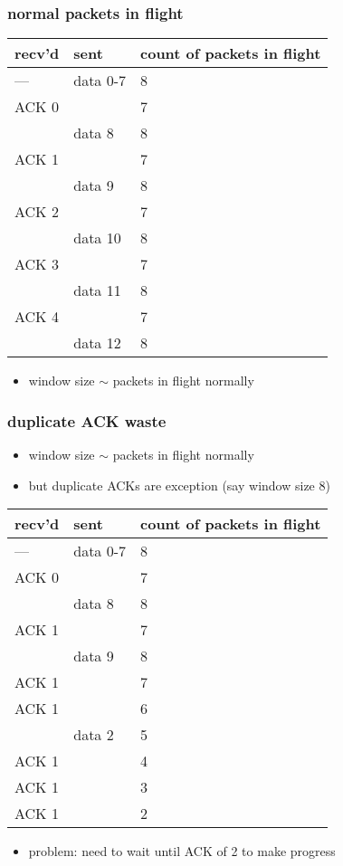 \begin{frame}
\frametitle{normal packets in flight}
{\fontsize{10}{11}\selectfont
\begin{tabular}{lll}
recv'd & sent & count of packets in flight \\ \hline
--- & data 0-7 & 8 \\
ACK 0 & ~ & 7 \\
~ & data 8 & 8 \\
ACK 1 & ~ & 7 \\
~ & data 9 & 8 \\
ACK 2 & ~  & 7 \\
~ & data 10 & 8 \\
ACK 3 & ~  & 7 \\
~ & data 11 & 8 \\
ACK 4 & ~  & 7 \\
~ & data 12 & 8 \\
\end{tabular}
}
\begin{itemize}
\item window size $\sim$ packets in flight normally
\end{itemize}
\end{frame}

\begin{frame}
\frametitle{duplicate ACK waste}
\begin{itemize}
\item window size $\sim$ packets in flight normally
\item but duplicate ACKs are exception (say window size 8)
\end{itemize}
{\fontsize{10}{11}\selectfont
\begin{tabular}{lll}
recv'd & sent & count of packets in flight \\ \hline
--- & data 0-7 & 8 \\
ACK 0 & ~ & 7 \\
~ & data 8 & 8 \\
ACK 1 & ~ & 7 \\
~ & data 9 & 8 \\
ACK 1 & ~  & 7 \\
ACK 1 & ~  & 6 \\
~ & data 2 & 5 \\
ACK 1 & ~ & 4 \\
ACK 1 & ~ & 3 \\
ACK 1 & ~ & 2 \\
\end{tabular}
}
\begin{itemize}
\item problem: need to wait until ACK of 2 to make progress
\end{itemize}
\end{frame}


